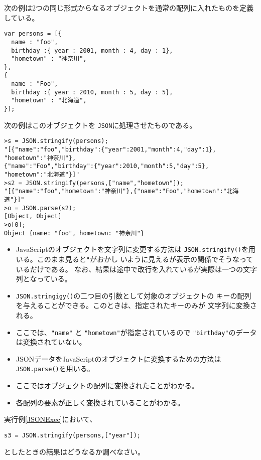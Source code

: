 \begin{Exec}\label{JSONExec}\upshape
次の例は2つの同じ形式からなるオブジェクトを通常の配列に入れたものを定義
 している。
\begin{Verbatim}
var persons = [{
  name : "foo",
  birthday :{ year : 2001, month : 4, day : 1},
  "hometown" : "神奈川",
},
{
  name : "Foo",
  birthday :{ year : 2010, month : 5, day : 5},
  "hometown" : "北海道",
}];
\end{Verbatim}
次の例はこのオブジェクトを \texttt{JSON}に処理させたものである。
\begin{Verbatim}
>s = JSON.stringify(persons);
"[{"name":"foo","birthday":{"year":2001,"month":4,"day":1},
"hometown":"神奈川"},
{"name":"Foo","birthday":{"year":2010,"month":5,"day":5},
"hometown":"北海道"}]"
>s2 = JSON.stringify(persons,["name","hometown"]);
"[{"name":"foo","hometown":"神奈川"},{"name":"Foo","hometown":"北海道"}]"
>o = JSON.parse(s2);
[Object, Object]
>o[0];
Object {name: "foo", hometown: "神奈川"}
\end{Verbatim}
\begin{itemize}
 \item JavaScriptのオブジェクトを文字列に変更する方法は
       \texttt{JSON.stringify()}を用いる。このまま見ると\verb+"+がおかし
       いように見えるが表示の関係でそうなっているだけである。%
なお、結果は途中で改行を入れているが実際は一つの文字列となっている。
 \item \texttt{JSON.stringigy()}の二つ目の引数として対象のオブジェクトの
       キーの配列を与えることができる。このときは、指定されたキーのみが
       文字列に変換される。
 \item ここでは、\verb+"name"+ と \verb+"hometown"+が指定されているので
\verb+"birthday"+のデータは変換されていない。
 \item JSONデータをJavaScriptのオブジェクトに変換するための方法は
       \texttt{JSON.parse()}を用いる。
 \item ここではオブジェクトの配列に変換されたことがわかる。
 \item 各配列の要素が正しく変換されていることがわかる。
\end{itemize}
\end{Exec}
\begin{Prob}\upshape
実行例\ref{JSONExec}において、
\begin{Verbatim}
s3 = JSON.stringify(persons,["year"]);
\end{Verbatim}
としたときの結果はどうなるか調べなさい。
\end{Prob}
